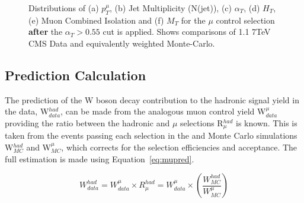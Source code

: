 \begin{figure}[htbp]
\begin{center}
\begin{minipage}[b]{1.\linewidth}
\end{minipage}
\caption{\label{fig:muonplots_afterat} Distributions of (a) $p_{T}^{\mu}$, (b) Jet Multiplicity (N(jet)), (c) $\alpha_{T}$, (d) $H_{T}$, (e) Muon Combined Isolation and (f) $M_{T}$ for the $\mu$ control selection \textbf{after} the $\alpha_{T} > 0.55$ cut is applied. Shows comparisons of 1.1  7TeV CMS Data and equivalently weighted Monte-Carlo.}
\label{fig:kinafter}
\end{center}
\end{figure}
\subsection{Prediction Calculation}

The prediction of the W boson decay contribution to the hadronic signal yield in the data, W$^{had}_{data}$, can be made from the analogous muon control yield W$^{\mu}_{data}$ providing the ratio between the hadronic and $\mu$ selections R$^{had}_{\mu}$ is known. This is taken from the events passing each selection in the \ttj and \wj Monte Carlo simulations W$^{had}_{MC}$ and W$^{\mu}_{MC}$, which corrects for the selection efficiencies and acceptance. The full estimation is made using Equation~\ref{eq:mupred}.

\begin{equation}
W^{had}_{data} = W^{\mu}_{data}\times R^{had}_{\mu} = W^{\mu}_{data}\times (\frac{W^{had}_{MC}}{W^{\mu}_{MC}})
\label{eq:mupred}
\end{equation}

